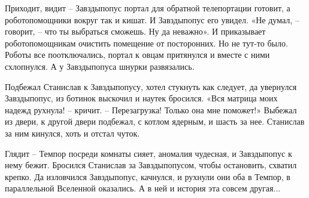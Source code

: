 \documentclass[ebook,oneside,final,openright]{memoir}
\begin{document}
\par
Приходит, видит – Завздыпопус портал для обратной телепортации готовит, а роботопомощники вокруг так и кишат. И Завздыпопус его увидел. «Не думал, – говорит, – что ты выбраться сможешь. Ну да неважно». И приказывает роботопомощникам очистить помещение от посторонних. Но не тут-то было. Роботы все поотключались, портал к овцам притянулся и вместе с ними схлопнулся. А у Завздыпопуса шнурки развязались.\par
\par
Подбежал Станислав к Завздыпопусу, хотел стукнуть как следует, да увернулся Завздыпопус, из ботинок выскочил и наутек бросился. «Вся матрица моих надежд рухнула! – кричит. – Перезагрузка! Только она мне поможет!» Выбежал из двери, к другой двери подбежал, с котлом ядерным, и шасть за нее. Станислав за ним кинулся, хоть и отстал чуток.\par
\par
Глядит – Темпор посреди комнаты сияет, аномалия чудесная, и Завздыпопус к нему бежит. Бросился Станислав за Завздыпопусом, чтобы остановить, схватил крепко. Да изловчился Завздыпопус, качнулся, и рухнули они оба в Темпор, в параллельной Вселенной оказались. А в ней и история эта совсем другая...\par
\end{document}
